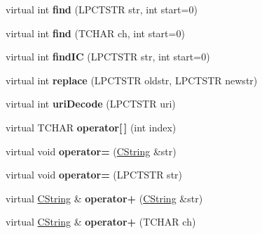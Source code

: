 \begin{DoxyCompactItemize}
\item 
\hypertarget{class_c_string_a34ca981fe4599b24ed4312ee95a7f008}{virtual int {\bfseries find} (L\-P\-C\-T\-S\-T\-R str, int start=0)}\label{class_c_string_a34ca981fe4599b24ed4312ee95a7f008}

\item 
\hypertarget{class_c_string_a225a9d464e22c27b750749426906c308}{virtual int {\bfseries find} (T\-C\-H\-A\-R ch, int start=0)}\label{class_c_string_a225a9d464e22c27b750749426906c308}

\item 
\hypertarget{class_c_string_a0d1d84239f8a01f8dd4e012fddc63cbe}{virtual int {\bfseries find\-I\-C} (L\-P\-C\-T\-S\-T\-R str, int start=0)}\label{class_c_string_a0d1d84239f8a01f8dd4e012fddc63cbe}

\item 
\hypertarget{class_c_string_a2330b9d10792cbf3dec9ccd747c67da1}{virtual int {\bfseries replace} (L\-P\-C\-T\-S\-T\-R oldstr, L\-P\-C\-T\-S\-T\-R newstr)}\label{class_c_string_a2330b9d10792cbf3dec9ccd747c67da1}

\item 
\hypertarget{class_c_string_aade923167835efe164b5e06fb192e176}{virtual int {\bfseries uri\-Decode} (L\-P\-C\-T\-S\-T\-R uri)}\label{class_c_string_aade923167835efe164b5e06fb192e176}

\item 
\hypertarget{class_c_string_a198badb5e4ffe29258ae2476836e274a}{virtual T\-C\-H\-A\-R {\bfseries operator\mbox{[}$\,$\mbox{]}} (int index)}\label{class_c_string_a198badb5e4ffe29258ae2476836e274a}

\item 
\hypertarget{class_c_string_a68736847dab1a820326697c0321bce63}{virtual void {\bfseries operator=} (\hyperlink{class_c_string}{C\-String} \&str)}\label{class_c_string_a68736847dab1a820326697c0321bce63}

\item 
\hypertarget{class_c_string_a1ceee05f01a8bc4b96a25f0bfb3d9a2b}{virtual void {\bfseries operator=} (L\-P\-C\-T\-S\-T\-R str)}\label{class_c_string_a1ceee05f01a8bc4b96a25f0bfb3d9a2b}

\item 
\hypertarget{class_c_string_ae4536c8c8913afaebdc72f79bbe02d9d}{virtual \hyperlink{class_c_string}{C\-String} \& {\bfseries operator+} (\hyperlink{class_c_string}{C\-String} \&str)}\label{class_c_string_ae4536c8c8913afaebdc72f79bbe02d9d}

\item 
\hypertarget{class_c_string_a80701bf9d780b7cfa78930de18a54e5e}{virtual \hyperlink{class_c_string}{C\-String} \& {\bfseries operator+} (T\-C\-H\-A\-R ch)}\label{class_c_string_a80701bf9d780b7cfa78930de18a54e5e}


\end{DoxyCompactItemize}
